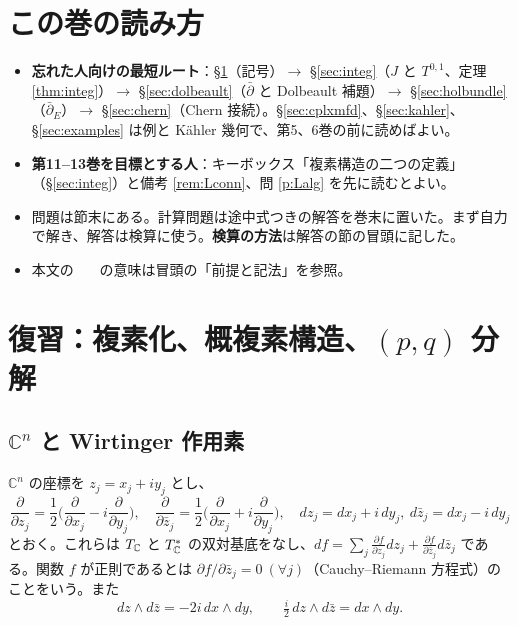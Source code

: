 \section*{この巻の読み方}
\begin{itemize}
\item \textbf{忘れた人向けの最短ルート}：§\ref{sec:review}（記号）$\to$ §\ref{sec:integ}（$J$ と $T^{0,1}$、定理 \ref{thm:integ}）$\to$ §\ref{sec:dolbeault}（$\bar\partial$ と Dolbeault 補題）$\to$ §\ref{sec:holbundle}（$\bar\partial_E$）$\to$ §\ref{sec:chern}（Chern 接続）。§\ref{sec:cplxmfd}、§\ref{sec:kahler}、§\ref{sec:examples} は例と Kähler 幾何で、第5、6巻の前に読めばよい。
\item \textbf{第11--13巻を目標とする人}：キーボックス「複素構造の二つの定義」（§\ref{sec:integ}）と備考 \ref{rem:Lconn}、問 \ref{p:Lalg} を先に読むとよい。
\item 問題は節末にある。計算問題は途中式つきの解答を巻末に置いた。まず自力で解き、解答は検算に使う。\textbf{検算の方法}は解答の節の冒頭に記した。
\item 本文の \tC\ \tP\ \tQ\ の意味は冒頭の「前提と記法」を参照。
\end{itemize}


\section{復習：複素化、概複素構造、$(p,q)$ 分解}\label{sec:review}

\subsection{$\mathbb C^n$ と Wirtinger 作用素}
$\mathbb C^n$ の座標を $z_j=x_j+iy_j$ とし、
\[
\frac{\partial}{\partial z_j}=\frac12\Big(\frac{\partial}{\partial x_j}-i\frac{\partial}{\partial y_j}\Big),\quad
\frac{\partial}{\partial \bar z_j}=\frac12\Big(\frac{\partial}{\partial x_j}+i\frac{\partial}{\partial y_j}\Big),\quad
dz_j=dx_j+i\,dy_j,\ d\bar z_j=dx_j-i\,dy_j
\]
とおく。これらは $T_{\mathbb C}$ と $T_{\mathbb C}^*$ の双対基底をなし、$df=\sum_j\frac{\partial f}{\partial z_j}dz_j+\frac{\partial f}{\partial\bar z_j}d\bar z_j$ である。関数 $f$ が正則であるとは $\partial f/\partial\bar z_j=0\ (\forall j)$（Cauchy--Riemann 方程式）のことをいう。また
\begin{equation}\label{eq:dzdzbar}
dz\wedge d\bar z=-2i\,dx\wedge dy,\qquad \tfrac i2\,dz\wedge d\bar z=dx\wedge dy .
\end{equation}

